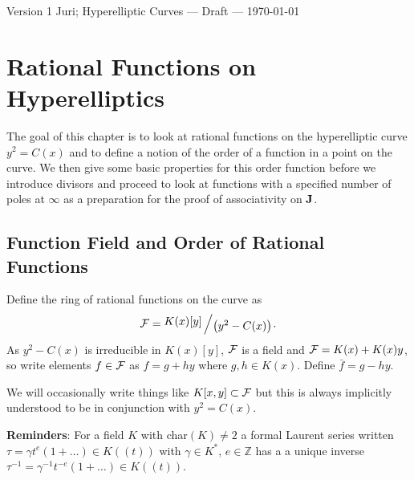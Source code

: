 \documentclass[english,11pt,a4paper]{article}
\begin{document}
Version 1 \scriptsize \hfill Juri; Hyperelliptic Curves --- Draft --- \today
\normalsize

\section{Rational Functions on Hyperelliptics}

The goal of this chapter is to look at rational functions on the hyperelliptic curve $y^2 = C(x)$ and to define a notion of the order of a function in a point on the curve. We then give some basic properties for this order function before we introduce divisors and proceed to look at functions with a specified number of poles at $\infty$ as a preparation for the proof of associativity on $\mathbf{J}$. %

\subsection{Function Field and Order of Rational Functions}

\begin{defin}
	Define the ring of rational functions on the curve as
	\begin{align*}
	  \F = \bigslant{K(x)[y]}{\big(y^2-C(x)\big)}.
	\end{align*}
  As $y^2-C(x)$ is irreducible in $K(x)[y]$, $\mathcal{F}$ is a field
  and $\mathcal{F} = K(x) + K(x) y$, so write elements $f \in \mathcal{F}$ as $f = g + hy$ where $g,h \in K(x)$. Define $\bar f = g - hy$.

  We will occasionally write things like $K[x,y] \subset \mathcal{F}$ but this is always implicitly understood to be in conjunction with $y^2=C(x)$.
\end{defin}

\vspace{3mm}

\textbf{Reminders}: For a field $K$ with char$(K) \neq 2$ a formal Laurent series written $\tau = \gamma t^e (1 + \dots)\in K (\! (t)\! )$ with $\gamma \in K^*$, $e \in \mathds{Z}$ has a a unique inverse $\tau^{-1} = \gamma^{-1} t^{-e} (1 + \dots) \in K (\! (t)\! )$.
\end{document}
